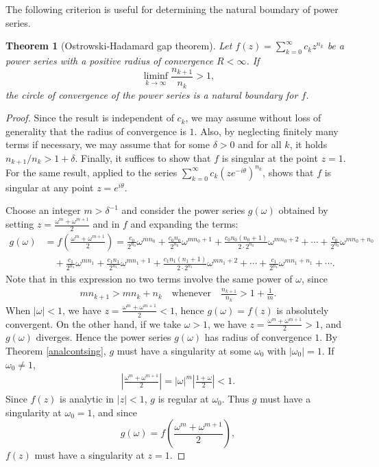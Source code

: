 \documentclass{article}
\numberwithin{equation}{section}
\theoremstyle{plain}
\newtheorem{theorem}{Theorem}[section]
\theoremstyle{definition}
\begin{document}
The following criterion is useful for determining the natural boundary of power series.
\begin{theorem}[Ostrowski-Hadamard gap theorem]
Let $f(z)=\sum_{k=0}^\infty c_kz^{n_k}$ be a power series with a positive radius of convergence $R<\infty$. If $$\liminf_{k\to\infty}\frac{n_{k+1}}{n_k}>1,$$ the circle of convergence of the power series is a natural boundary for $f$. 
\end{theorem}
\begin{proof}
Since the result is independent of $c_k$, we may assume without loss of generality that the radius of convergence is $1$. Also, by neglecting finitely many terms if necessary, we may assume that for some $\delta>0$ and for all $k$, it holds $n_{k+1}/n_k > 1+\delta$. Finally, it suffices
to show that $f$ is singular at the point $z = 1$. For the same result, applied to the series $\sum_{k=0}^\infty c_k(ze^{-i\theta})^{n_k}$, shows that $f$ is singular at any point $z=e^{i\theta}$.

Choose an integer $m>\delta^{-1}$ and consider the power
series $g(\omega)$ obtained by setting $z=\frac{\omega^m+\omega^{m+1}}{2}$
and in $f$ and expanding the terms:
\begin{align*}
	g(\omega)&=f\left(\frac{\omega^m+\omega^{m+1}}{2}\right)=\frac{c_0}{2^{n_0}}\omega^{mn_0}+\frac{c_0n_0}{2^{n_0}}\omega^{mn_0+1}+\frac{c_0n_0(n_0+1)}{2\cdot 2^{n_0}}\omega^{mn_0+2}+\cdots+\frac{c_0}{2^{n_0}}\omega^{mn_0+n_0}\\
	&\quad +\frac{c_1}{2^{n_1}}\omega^{mn_1}+\frac{c_1n_1}{2^{n_1}}\omega^{mn_1+1}+\frac{c_1n_1(n_1+1)}{2\cdot 2^{n_1}}\omega^{mn_1+2}+\cdots+\frac{c_1}{2^{n_1}}\omega^{mn_1+n_1}+\cdots.
\end{align*}
Note that in this expression no two terms involve the same power of $\omega$, since
\begin{align*}
	mn_{k+1}>mn_k+n_k\quad\mathrm{whenever}\quad \frac{n_{k+1}}{n_k}>1+\frac{1}{m}.
\end{align*}
When $\vert\omega\vert<1$, we have $z=\frac{\omega^m+\omega^{m+1}}{2}<1$, hence $g(\omega)=f(z)$ is absolutely convergent. On the other hand, if we take $\omega>1$, we have $z=\frac{\omega^m+\omega^{m+1}}{2}>1$, and $g(\omega)$ diverges. Hence the power series $g(\omega)$ has radius of convergence $1$. By Theorem \ref{analcontsing}, $g$ must have a singularity at some $\omega_0$ with $\vert\omega_0\vert=1$. If $\omega_0\neq 1$, 
\begin{align*}
	\left\vert\frac{\omega^m+\omega^{m+1}}{2}\right\vert=\vert\omega\vert^m\left\vert\frac{1+\omega}{2}\right\vert<1.
\end{align*}
Since $f(z)$ is analytic in $\vert z\vert<1$, $g$ is regular at $\omega_0$. Thus $g$ must have a singularity at $\omega_0=1$, and since $$g(\omega)=f\left(\frac{\omega^m+\omega^{m+1}}{2}\right),$$ $f(z)$ must have a singularity at $z=1$.
\end{proof}
\end{document}
